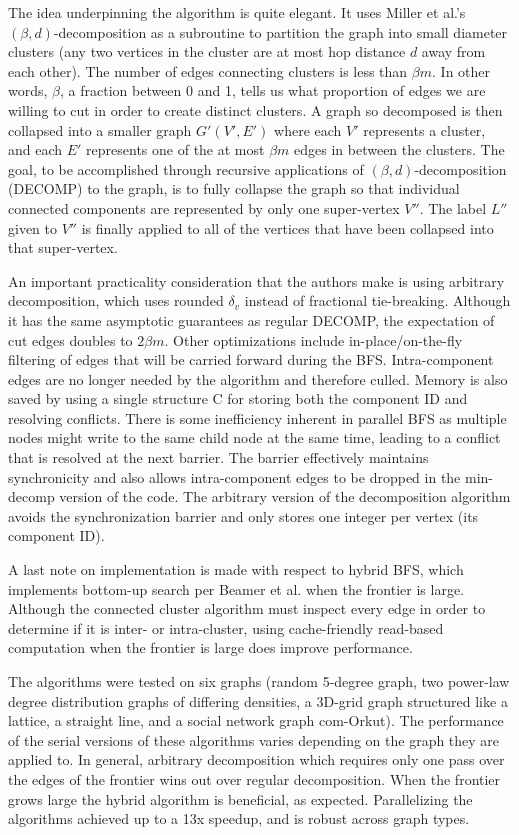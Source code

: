 The idea underpinning the algorithm is quite elegant. It uses Miller et al.'s $(\beta, d)$-decomposition as a subroutine to partition the graph into small diameter clusters (any two vertices in the cluster are at most hop distance $d$ away from each other). The number of edges connecting clusters is less than $\beta m$. In other words, $\beta$, a fraction between 0 and 1, tells us what proportion of edges we are willing to cut in order to create distinct clusters. A graph so decomposed is then collapsed into a smaller graph $G'(V',E')$ where each $V'$ represents a cluster, and each $E'$ represents one of the at most $\beta m$ edges in between the clusters. The goal, to be accomplished through recursive applications of $(\beta, d)$-decomposition (DECOMP) to the graph, is to fully collapse the graph so that individual connected components are represented by only one super-vertex $V''$. The label $L''$ given to $V''$ is finally applied to all of the vertices that have been collapsed into that super-vertex.

An important practicality consideration that the authors make is using arbitrary decomposition, which uses rounded $\delta_v$ instead of fractional tie-breaking. Although it has the same asymptotic guarantees as regular DECOMP, the expectation of cut edges doubles to $2\beta m$. Other optimizations include in-place/on-the-fly filtering of edges that will be carried forward during the BFS. Intra-component edges are no longer needed by the algorithm and therefore culled. Memory is also saved by using a single structure C for storing both the component ID and resolving conflicts. There is some inefficiency inherent in parallel BFS as multiple nodes might write to the same child node at the same time, leading to a conflict that is resolved at the next barrier. The barrier effectively maintains synchronicity and also allows intra-component edges to be dropped in the min-decomp version of the code. The arbitrary version of the decomposition algorithm avoids the synchronization barrier and only stores one integer per vertex (its component ID). 

A last note on implementation is made with respect to hybrid BFS, which implements bottom-up search per Beamer et al. when the frontier is large. Although the connected cluster algorithm must inspect every edge in order to determine if it is inter- or intra-cluster, using cache-friendly read-based computation when the frontier is large does improve performance.

The algorithms were tested on six graphs (random 5-degree graph, two power-law degree distribution graphs of differing densities, a 3D-grid graph structured like a lattice, a straight line, and a social network graph com-Orkut). The performance of the serial versions of these algorithms varies depending on the graph they are applied to. In general, arbitrary decomposition which requires only one pass over the edges of the frontier wins out over regular decomposition. When the frontier grows large the hybrid algorithm is beneficial, as expected. Parallelizing the algorithms achieved up to a 13x speedup, and is robust across graph types.

